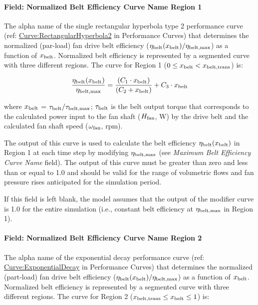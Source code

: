 \paragraph{Field: Normalized Belt Efficiency Curve Name Region 1}\label{field-normalized-belt-efficiency-curve-name-region-1}

The alpha name of the single rectangular hyperbola type 2 performance curve (ref: \hyperref[curverectangularhyperbola2]{Curve:RectangularHyperbola2} in Performance Curves) that determines the normalized (par-load) fan drive belt efficiency (\(\eta_{\rm{belt}}(x_{\rm{belt}}) / \eta_{\rm{belt, max}}\)) as a function of \(x_{\rm{belt}}\). Normalized belt efficiency is represented by a segmented curve with three different regions. The curve for Region 1 (\(0 \le x_{\rm{belt}} < x_{\rm{belt, trans}}\)) is:

\begin{equation}
  \frac{\eta_{\rm{belt}} ( x_{\rm{belt}} )}{\eta_{\rm{belt, max}}} = \frac{(C_1 \cdot x_{\rm{belt}})}{(C_2 + x_{\rm{belt}})} + C_3 \cdot x_{\rm{belt}}
\end{equation}

where \(x_{\rm{belt}}\) = \(\tau_{\rm{belt}} / \tau_{\rm{belt, max}}\); \(\tau_{\rm{belt}}\) is the belt output torque that corresponds to the calculated power input to the fan shaft (\(H_{\rm{fan}}\), W) by the drive belt and the calculated fan shaft speed (\(\omega_{\rm{fan}}\), rpm).

The output of this curve is used to calculate the belt efficiency \(\eta_{\rm{belt}} (x_{\rm{belt}})\) in Region 1 at each time step by modifying \(\eta_{\rm{belt, max}}\) (see \emph{Maximum Belt Efficiency Curve Name} field). The output of this curve must be greater than zero and less than or equal to 1.0 and should be valid for the range of volumetric flows and fan pressure rises anticipated for the simulation period.

If this field is left blank, the model assumes that the output of the modifier curve is 1.0 for the entire simulation (i.e., constant belt efficiency at \(\eta_{\rm{belt, max}}\) in Region 1).

\paragraph{Field: Normalized Belt Efficiency Curve Name Region 2}\label{field-normalized-belt-efficiency-curve-name-region-2}

The alpha name of the exponential decay performance curve (ref: \hyperref[curveexponentialdecay]{Curve:ExponentialDecay} in Performance Curves) that determines the normalized (part-load) fan drive belt efficiency (\(\eta_{\rm{belt}} (x_{\rm{belt}}) / \eta_{\rm{belt, max}}\)) as a function of \(x_{\rm{belt}}\). Normalized belt efficiency is represented by a segmented curve with three different regions. The curve for Region 2 (\(x_{\rm{belt, trans}} \le x_{\rm{belt}} \le 1\)) is:


